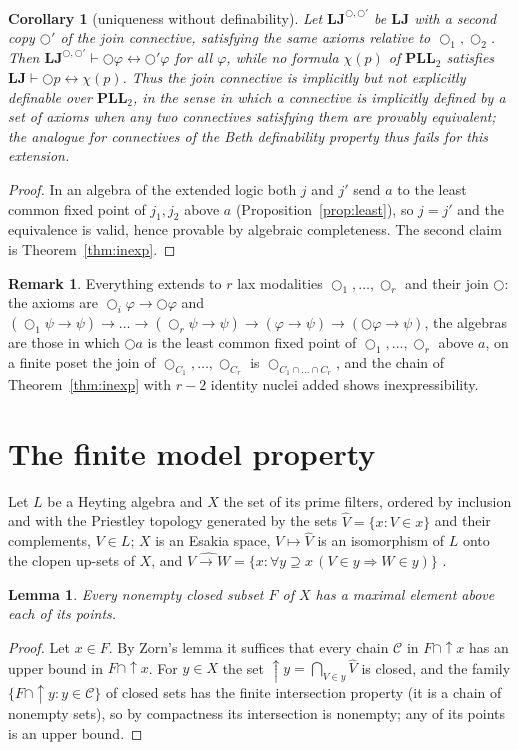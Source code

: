 \documentclass[11pt]{amsart}
\newtheorem{lem}[thm]{Lemma}
\newtheorem{cor}[thm]{Corollary}
\theoremstyle{definition}
\newtheorem{rem}[thm]{Remark}
\newcommand{\LLJ}{\mathbf{LJ}}
\newcommand{\PLLt}{\mathbf{PLL}_2}
\newcommand{\lax}{\bigcirc}
\newcommand{\laxa}{\bigcirc_1}
\newcommand{\laxb}{\bigcirc_2}
\begin{document}
\begin{cor}[uniqueness without definability]\label{cor:beth}
Let $\LLJ^{\lax,\lax'}$ be $\LLJ$ with a second copy $\lax'$ of the join
connective, satisfying the same axioms relative to $\laxa,\laxb$. Then
$\LLJ^{\lax,\lax'}\vdash\lax\varphi\leftrightarrow\lax'\varphi$ for all
$\varphi$, while no formula $\chi(p)$ of $\PLLt$ satisfies
$\LLJ\vdash\lax p\leftrightarrow\chi(p)$. Thus the join connective is
implicitly but not explicitly definable over $\PLLt$, in the sense in which
a connective is implicitly defined by a set of axioms when any two connectives
satisfying them are provably equivalent; the analogue for connectives of the
Beth definability property thus fails for this extension.
\end{cor}
\begin{proof}
In an algebra of the extended logic both $j$ and $j'$ send $a$ to the least
common fixed point of $j_1,j_2$ above $a$ (Proposition~\ref{prop:least}), so
$j=j'$ and the equivalence is valid, hence provable by algebraic completeness.
The second claim is Theorem~\ref{thm:inexp}.
\end{proof}

\begin{rem}
Everything extends to $r$ lax modalities $\lax_1,\dots,\lax_r$ and their
join $\lax$: the axioms are $\lax_i\varphi\to\lax\varphi$ and
$(\lax_1\psi\to\psi)\to\dots\to(\lax_r\psi\to\psi)\to(\varphi\to\psi)\to(\lax\varphi\to\psi)$,
the algebras are those in which $\lax a$ is the least common fixed point of
$\lax_1,\dots,\lax_r$ above $a$, on a finite poset the join of
$\lax_{C_1},\dots,\lax_{C_r}$ is $\lax_{C_1\cap\dots\cap C_r}$, and the
chain of Theorem~\ref{thm:inexp} with $r-2$ identity nuclei added shows
inexpressibility.
\end{rem}

\section{The finite model property}\label{sec:fmp}

Let $L$ be a Heyting algebra and $X$ the set of its prime filters, ordered by
inclusion and with the Priestley topology generated by the sets
$\hat V=\{x:V\in x\}$ and their complements, $V\in L$; $X$ is an Esakia space,
$V\mapsto\hat V$ is an isomorphism of $L$ onto the clopen up-sets of $X$, and
$\widehat{V\to W}=\{x:\forall y\supseteq x\,(V\in y\Rightarrow W\in y)\}$
\cite[Ch.~11]{DP}.

\begin{lem}\label{lem:max}
Every nonempty closed subset $F$ of $X$ has a maximal element above each of
its points.
\end{lem}
\begin{proof}
Let $x\in F$. By Zorn's lemma it suffices that every chain $\mathcal C$ in
$F\cap\uparrow\!x$ has an upper bound in $F\cap\uparrow\!x$. For $y\in X$
the set $\uparrow\!y=\bigcap_{V\in y}\hat V$ is closed, and the family
$\{F\cap\uparrow\!y:y\in\mathcal C\}$ of closed sets has the finite
intersection property (it is a chain of nonempty sets), so by compactness its
intersection is nonempty; any of its points is an upper bound.
\end{proof}
\end{document}
